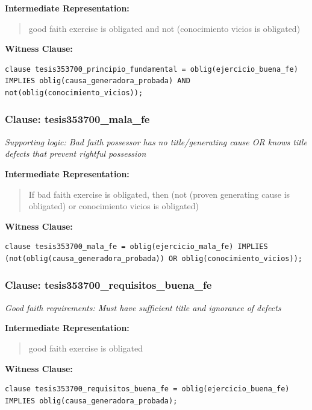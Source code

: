 \documentclass[11pt,a4paper]{article}
\begin{document}
\textbf{Intermediate Representation:}

\begin{quote}
good faith exercise is obligated and not (conocimiento vicios is obligated)
\end{quote}

\textbf{Witness Clause:}

\begin{lstlisting}[style=witnessstyle, language=Witness]
clause tesis353700_principio_fundamental = oblig(ejercicio_buena_fe) IMPLIES oblig(causa_generadora_probada) AND not(oblig(conocimiento_vicios));
\end{lstlisting}

\subsubsection{Clause: tesis353700\_mala\_fe}

\textit{Supporting logic: Bad faith possessor has no title/generating cause OR knows title defects that prevent rightful possession}

\textbf{Intermediate Representation:}

\begin{quote}
If bad faith exercise is obligated, then (not (proven generating cause is obligated) or conocimiento vicios is obligated)
\end{quote}

\textbf{Witness Clause:}

\begin{lstlisting}[style=witnessstyle, language=Witness]
clause tesis353700_mala_fe = oblig(ejercicio_mala_fe) IMPLIES (not(oblig(causa_generadora_probada)) OR oblig(conocimiento_vicios));
\end{lstlisting}

\subsubsection{Clause: tesis353700\_requisitos\_buena\_fe}

\textit{Good faith requirements: Must have sufficient title and ignorance of defects}

\textbf{Intermediate Representation:}

\begin{quote}
good faith exercise is obligated
\end{quote}

\textbf{Witness Clause:}

\begin{lstlisting}[style=witnessstyle, language=Witness]
clause tesis353700_requisitos_buena_fe = oblig(ejercicio_buena_fe) IMPLIES oblig(causa_generadora_probada);
\end{lstlisting}
\end{document}

